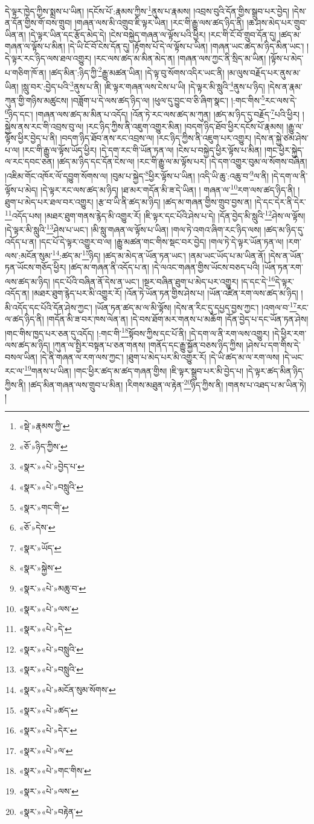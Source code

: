 དེ་ལྟར་ཁྱེད་ཀྱིས་སྨྲས་པ་ཡིན། །དངོས་པོ་:རྣམས་ཀྱིས་\footnote{«སྡེ་»རྣམས་ཀྱི་}ནུས་པ་རྣམས། །འབྲས་བུའི་དོན་གྱིས་སྒྲུབ་པར་བྱེད། །དེས་ན་དོན་གྱིས་གོ་བས་གྲུབ། །གཞན་ལས་མི་འགྲུབ་ཇི་ལྟར་ཡིན། །རང་གི་རྒྱུ་ལས་ཚད་ཉིད་ནི། །ཆ་ཤས་མེད་པར་གྲུབ་ཡིན་ན། །དེ་ལྟར་ཡིན་དང་རྩོད་མེད་དེ། །ངེས་བསྐྱེད་གཞན་ལ་ལྟོས་པའི་ཕྱིར། །རང་གི་ངོ་བོ་གྲུབ་དོན་དུ། །ཚད་མ་གཞན་ལ་ལྟོས་པ་མིན། །དེ་ཡི་ངོ་བོ་ངེས་དོན་དུ། །རྟོགས་པོ་དེ་ལ་ལྟོས་པ་ཡིན། །གཞན་ཡང་ཚད་མ་ཉིད་མིན་ཡང་། །དེ་ལྟར་རང་ཉིད་ལས་ཐལ་འགྱུར། །རང་ལས་ཚད་མ་མིན་མེད་ན། །གཞན་ལས་ཀྱང་ནི་སྲིད་མ་ཡིན། །ལྟོས་པ་མེད་པ་གཅིག་ཁོ་ན། །ཚད་མིན་:ཉིད་ཀྱི་\footnote{«ཅོ་»ཉིད་ཀྱིས་}རྒྱུ་མཚན་ཡིན། །དེ་ལྟ་བུ་སོགས་འདིར་ཡང་ནི། །མ་ལུས་བརྗོད་པར་ནུས་མ་ཡིན། །སླུ་བར་:བྱེད་པའི་\footnote{«སྣར་»«པེ་»བྱེད་པ་}ནུས་པ་ནི། །ཇི་ལྟར་གཞན་ལས་ངེས་པ་ཡི། །དེ་ལྟར་མི་སླུའི་\footnote{«སྣར་»«པེ་»བསླུའི་}ནུས་པ་ཉིད། །དེས་ན་རྣམ་ཀུན་གྱི་གཉིས་མཚུངས། །བཟློག་པ་དེ་ལས་ཚད་ཉིད་ལ། །ཕུལ་དུ་བྱུང་བ་ཅི་ཞིག་སྣང་། །:གང་གིས་\footnote{«སྣར་»གང་གི་}རང་ལས་དེ་\footnote{«ཅོ་»དེས་}ཉིད་དང་། །གཞན་ལས་ཚད་མ་མིན་པ་འདོད། །འོན་ཏེ་རང་ལས་ཚད་མ་ཀུན། །ཚད་མ་ཉིད་དུ་བརྗོད་\footnote{«སྣར་»ཡོད་}པའི་ཕྱིར། །སྐྱེས་ནས་རང་གི་འབྲས་བུ་ལ། །རང་ཉིད་ཀྱིས་ནི་འཇུག་འགྱུར་མིན། །བདག་ཉིད་ཐོབ་ཕྱིར་དངོས་པོ་རྣམས། །རྒྱུ་ལ་ལྟོས་ཕྱིར་བྱེད་པ་ནི། །བདག་ཉིད་ཐོབ་ནས་རང་འབྲས་ལ། །རང་ཉིད་ཀྱིས་ནི་འཇུག་པར་འགྱུར། །དེས་ན་སྐྱེ་ཙམ་ཤེས་པ་ལ། །རང་གི་རྒྱུ་ལ་ལྟོས་ཡོད་ཕྱིར། །དེ་དག་རང་གི་ཡོན་ཏན་ལ། །ངེས་པ་བསྐྱེད་ཕྱིར་ལྟོས་པ་མིན། །གང་ཕྱིར་སྐྱེད་ལ་རང་དབང་ཅན། །ཚད་མ་ཉིད་དང་དོན་ངེས་ལ། །རང་གི་རྒྱུ་ལ་མ་ལྟོས་པར། །དེ་དག་འགྱུར་བུམ་ལ་སོགས་བཞིན། །འཇིམ་གོང་འཁོར་ལོ་དབྱུག་སོགས་ལ། །བུམ་པ་སྐྱེད་\footnote{«སྣར་»སྐྱེས་}ཕྱིར་ལྟོས་པ་ཡིན། །འདི་ཡི་ཆུ་:འཆུ་བ་\footnote{«སྣར་»«པེ་»མཆུ་བ་}ལ་ནི། །དེ་དག་ལ་ནི་ལྟོས་པ་མེད། །དེ་ལྟར་རང་ལས་ཚད་མ་ཉིད། །ཐ་མར་གདོན་མི་ཟ་དེ་ཡིན། །
གཞན་ལ་\footnote{«སྣར་»«པེ་»ལས་}རག་ལས་ཚད་ཉིད་ནི། །ཐུག་པ་མེད་པར་ཐལ་བར་འགྱུར། །རྩ་བ་ཡི་ནི་ཚད་མ་ཉིད། །ཚད་མ་གཞན་གྱིས་གྲུབ་བྱས་ན། །དེ་དང་དེར་ནི་དེར་\footnote{«སྣར་»«པེ་»དེ་}འདོད་པས། །མཐར་ཐུག་གནས་རྙེད་མི་འགྱུར་རོ། །ཇི་ལྟར་དང་པོའི་ཤེས་པ་དེ། །དོན་བྱེད་མི་སླུའི་\footnote{«སྣར་»«པེ་»བསླུའི་}ཤེས་ལ་ལྟོས། །དེ་ལྟར་མི་སླུའི་\footnote{«སྣར་»«པེ་»བསླུའི་}ཤེས་པ་ཡང་། །མི་སླུ་གཞན་ལ་ལྟོས་པ་ཡིན། །གལ་ཏེ་འགའ་ཞིག་རང་ཉིད་ལས། །ཚད་མ་ཉིད་དུ་འདོད་པ་ན། །དང་པོ་དེ་ལྟར་འགྱུར་བ་ལ། །རྒྱུ་མཚན་གང་གིས་སྡང་བར་བྱེད། །གལ་ཏེ་དེ་ལྟར་ཡོན་ཏན་ལ། །རག་ལས་:མངོན་སུམ་\footnote{«སྣར་»«པེ་»མངོན་སུམ་སོགས་}:ཚད་མ་\footnote{«སྣར་»«པེ་»ཚད་}ཉིད། །ཚད་མ་མེད་ན་ཡོན་ཏན་ཡང་། །ནམ་ཡང་ཡོད་པ་མ་ཡིན་ནོ། །དེས་ན་ཡོན་ཏན་ཡོངས་གཅོད་ཕྱིར། །ཚད་མ་གཞན་ནི་འདོད་པ་ན། །དེ་ལའང་གཞན་གྱིས་ཡོངས་བཅད་པའི། །ཡོན་ཏན་རག་ལས་ཚད་མ་ཉིད། །དང་པོའི་བཞིན་ནོ་དེས་ན་ཡང་། །སྔར་བཞིན་ཐུག་པ་མེད་པར་འགྱུར། །ད་དང་དེ་\footnote{«སྣར་»«པེ་»དེར་}དེ་ལྟར་འདོད་ན། །མཐར་ཐུག་རྙེད་པར་མི་འགྱུར་རོ། །འོན་ཏེ་ཡོན་ཏན་གྱིས་ཤེས་པ། །ཡོན་འཛིན་རག་ལས་ཚད་མ་ཉིད། །མི་འདོད་དང་པོའི་དོན་ཤེས་ཀྱང་། །ཡོན་ཏན་ཚད་མ་ལ་མི་ལྟོས། །དེས་ན་རིང་དུ་དཔྱད་བྱས་ཀྱང་། །འགལ་བ་\footnote{«སྣར་»«པེ་»ལ་}རང་ལ་ཚད་ཉིད་ནི། །གདོན་མི་ཟ་བར་ཁས་ལེན་ན། །དེ་བས་ཐོག་མར་གནས་པ་མཆོག །དོན་བྱེད་པ་དང་ཡོན་ཏན་ཤེས། །གང་གིས་ཁྱད་པར་ཅན་དུ་འདོད། །:གང་གི་\footnote{«སྣར་»«པེ་»གང་གིས་}སྟོབས་ཀྱིས་དང་པོ་ནི། །དེ་དག་ལ་ནི་རག་ལས་འགྱུར། །དེ་ཕྱིར་རག་ལས་ཚད་མ་ཉིད། །ཀུན་ལ་སྤྱིར་བསྟན་པ་ཅན་གནས། །གནོད་དང་རྒྱུ་སྐྱོན་བཅས་ཉིད་ཀྱིས། །ཤེས་པ་དག་གིས་དེ་བསལ་ཡིན། །དེ་ནི་གཞན་ལ་རག་ལས་ཀྱང་། །ཐུག་པ་མེད་པར་མི་འགྱུར་རོ། །དེ་ཡི་ཚད་མ་ལ་རག་ལས། །དེ་ཡང་རང་ལ་\footnote{«སྣར་»«པེ་»ལས་}གནས་པ་ཡིན། །གང་ཕྱིར་ཚད་མ་ཚད་གཞན་གྱིས། །ཇི་ལྟར་སྒྲུབ་པར་མི་བྱེད་པ། །དེ་ལྟར་ཚད་མིན་ཉིད་ཀྱིས་ནི། །ཚད་མིན་གཞན་ལས་གྲུབ་པ་མིན། །རིགས་མཐུན་ལ་རྟེན་\footnote{«སྣར་»«པེ་»བརྟེན་}ཉིད་ཀྱིས་ནི། །གནས་པ་འཐད་པ་མ་ཡིན་ཏེ། །
